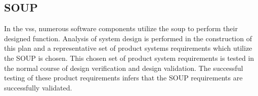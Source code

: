 \subsection{SOUP}
In the \gls{vss}, numerous software components utilize the \gls{soup} to perform
their designed function.  Analysis of system design is performed in the
construction of this plan and a representative set of product systems
requirements which utilize the SOUP is chosen.  This chosen set of product
system requirements is tested in the normal course of design verification and
design validation.  The successful testing of these product requirements infers
that the SOUP requirements are successfully validated.
